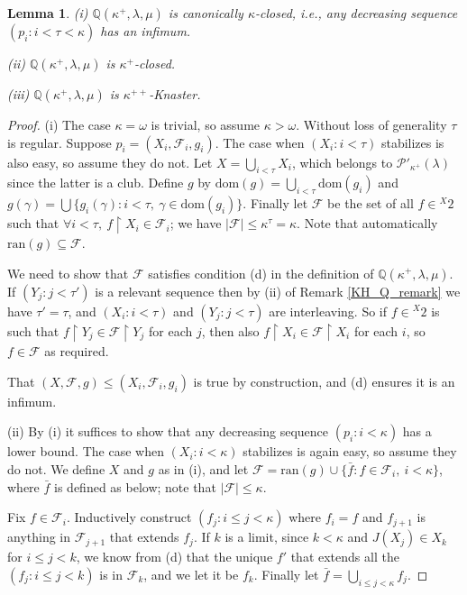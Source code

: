 \documentclass[10pt,reqno]{amsart}
\theoremstyle{plain}
\newtheorem{lemma}[theorem]{Lemma}
\theoremstyle{definition}
\theoremstyle{remark}
\begin{document}
\begin{lemma}\label{KH_Q_closure_Knaster}
(i) $\mathbb{Q}(\kappa^+,\lambda,\mu)$ is canonically $\kappa$-closed, i.e., any decreasing sequence $(p_i:i<\tau<\kappa)$ has an infimum.

(ii) $\mathbb{Q}(\kappa^+,\lambda,\mu)$ is $\kappa^+$-closed.

(iii) $\mathbb{Q}(\kappa^+,\lambda,\mu)$ is $\kappa^{++}$-Knaster.
\end{lemma}
\begin{proof}

(i) The case $\kappa=\omega$ is trivial, so assume $\kappa>\omega$. Without loss of generality $\tau$ is regular. Suppose $p_i=(X_i,\mathcal{F}_i,g_i)$. The case when $(X_i:i<\tau)$ stabilizes is also easy, so assume they do not. Let $X=\bigcup_{i<\tau}X_i$, which belongs to $\mathcal{P}'_{\kappa^+}(\lambda)$ since the latter is a club. Define $g$ by $\mathrm{dom}(g)=\bigcup_{i<\tau}\mathrm{dom}(g_i)$ and $g(\gamma)=\bigcup\{g_i(\gamma):i<\tau,\ \gamma\in\mathrm{dom}(g_i)\}$. Finally let $\mathcal{F}$ be the set of all $f\in {}^{X}2$ such that $\forall i<\tau,\ f\upharpoonright X_i\in\mathcal{F}_i$; we have $|\mathcal{F}|\leq\kappa^\tau=\kappa$. Note that automatically $\mathrm{ran}(g)\subseteq\mathcal{F}$.

We need to show that $\mathcal{F}$ satisfies condition (d) in the definition of $\mathbb{Q}(\kappa^+,\lambda,\mu)$. If $(Y_j:j<\tau')$ is a relevant sequence then by (ii) of Remark \ref{KH_Q_remark} we have $\tau'=\tau$, and $(X_i:i<\tau)$ and $(Y_j:j<\tau)$ are interleaving. So if $f\in{}^{X}2$ is such that $f\upharpoonright Y_j\in\mathcal{F}\upharpoonright Y_j$ for each $j$, then also $f\upharpoonright X_i\in\mathcal{F}\upharpoonright X_i$ for each $i$, so $f\in\mathcal{F}$ as required.

That $(X,\mathcal{F},g)\leq(X_i,\mathcal{F}_i,g_i)$ is true by construction, and (d) ensures it is an infimum.

(ii) By (i) it suffices to show that any decreasing sequence $(p_i:i<\kappa)$ has a lower bound. The case when $(X_i:i<\kappa)$ stabilizes is again easy, so assume they do not. We define $X$ and $g$ as in (i), and let $\mathcal{F}=\mathrm{ran}(g)\cup\{\bar{f}:f\in\mathcal{F}_i,\ i<\kappa\}$, where $\bar{f}$ is defined as below; note that $|\mathcal{F}|\leq\kappa$.

Fix $f\in\mathcal{F}_i$. Inductively construct $(f_j:i\leq j<\kappa)$ where $f_i=f$ and $f_{j+1}$ is anything in $\mathcal{F}_{j+1}$ that extends $f_j$. If $k$ is a limit, since $k<\kappa$ and $J(X_j)\in X_k$ for $i\leq j<k$, we know from (d) that the unique $f'$ that extends all the $(f_j:i\leq j<k)$ is in $\mathcal{F}_k$, and we let it be $f_k$. Finally let $\bar{f}=\bigcup_{i\leq j<\kappa}f_j$.


\end{proof}
\end{document}
